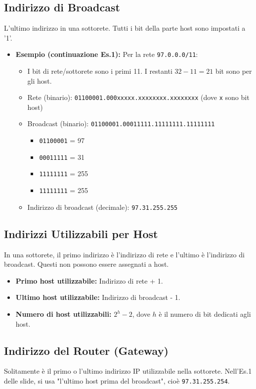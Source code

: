 \documentclass{article}
\begin{document}
\subsection{Indirizzo di Broadcast}
L'ultimo indirizzo in una sottorete. Tutti i bit della parte host sono impostati a '1'.
\begin{itemize}
    \item \textbf{Esempio (continuazione Es.1):} Per la rete \texttt{97.0.0.0/11}:
    \begin{itemize}
        \item I bit di rete/sottorete sono i primi 11. I restanti $32 - 11 = 21$ bit sono per gli host.
        \item Rete (binario): \texttt{01100001.000xxxxx.xxxxxxxx.xxxxxxxx} (dove \texttt{x} sono bit host)
        \item Broadcast (binario): \texttt{01100001.00011111.11111111.11111111}
        \begin{itemize}
            \item \texttt{01100001} = 97
            \item \texttt{00011111} = 31
            \item \texttt{11111111} = 255
            \item \texttt{11111111} = 255
        \end{itemize}
        \item Indirizzo di broadcast (decimale): \texttt{97.31.255.255}
    \end{itemize}
\end{itemize}

\subsection{Indirizzi Utilizzabili per Host}
In una sottorete, il primo indirizzo è l'indirizzo di rete e l'ultimo è l'indirizzo di broadcast. Questi non possono essere assegnati a host.
\begin{itemize}
    \item \textbf{Primo host utilizzabile:} Indirizzo di rete + 1.
    \item \textbf{Ultimo host utilizzabile:} Indirizzo di broadcast - 1.
    \item \textbf{Numero di host utilizzabili:} $2^h - 2$, dove $h$ è il numero di bit dedicati agli host.
\end{itemize}

\subsection{Indirizzo del Router (Gateway)}
Solitamente è il primo o l'ultimo indirizzo IP utilizzabile nella sottorete. Nell'Es.1 delle slide, si usa "l'ultimo host prima del broadcast", cioè \texttt{97.31.255.254}.
\end{document}
